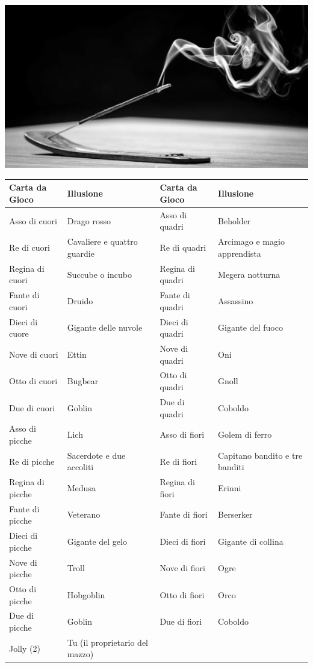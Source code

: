 \medskip

\begin{center}
	\includegraphics[width=0.55\linewidth]{immagini/Incenso.png}

\end{center}

\begin{tabular}{ll|ll}
	\textbf{Carta da Gioco}& \textbf{Illusione}&\textbf{Carta da Gioco}& \textbf{Illusione}\\
	\hline
	Asso di cuori &Drago rosso&Asso di quadri& Beholder\\
	Re di cuori &Cavaliere e quattro guardie&Re di quadri & Arcimago e magio apprendista\\
	Regina di cuori &Succube o incubo&Regina di quadri &Megera notturna\\
	Fante di cuori &Druido&Fante di quadri &Assassino\\
	Dieci di cuore &Gigante delle nuvole&Dieci di quadri &Gigante del fuoco\\
	Nove di cuori &Ettin&Nove di quadri &Oni\\
	Otto di cuori& Bugbear&Otto di quadri &Gnoll\\
	Due di cuori &Goblin&Due di quadri &Coboldo\\
	Asso di picche &Lich&Asso di fiori& Golem di ferro\\
	Re di picche &Sacerdote e due accoliti&Re di fiori &Capitano bandito e tre banditi\\
	Regina di picche& Medusa&Regina di fiori &Erinni\\
	Fante di picche &Veterano&Fante di fiori &Berserker\\
	Dieci di picche &Gigante del gelo&Dieci di fiori &Gigante di collina\\
	Nove di picche &Troll&Nove di fiori &Ogre\\
	Otto di picche &Hobgoblin&Otto di fiori& Orco\\
	Due di picche &Goblin&Due di fiori &Coboldo\\
	Jolly (2) &Tu (il proprietario del mazzo)&&\\
\end{tabular}

